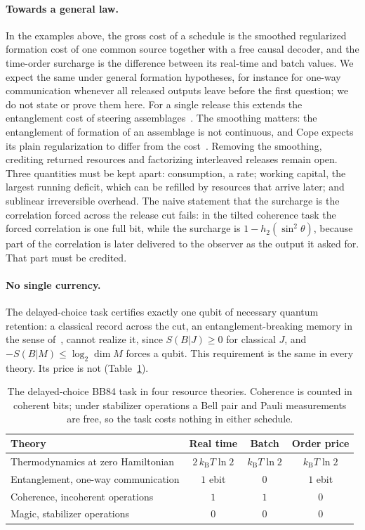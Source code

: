 \documentclass[11pt]{article}
\theoremstyle{definition}
\theoremstyle{remark}
\newcommand{\kB}{k_{\mathrm B}}
\begin{document}
\paragraph{Towards a general law.} In the examples above, the gross cost of a schedule is the smoothed regularized formation cost of one common source together with a free causal decoder, and the time-order surcharge is the difference between its real-time and batch values. We expect the same under general formation hypotheses, for instance for one-way communication whenever all released outputs leave before the first question; we do not state or prove them here. For a single release this extends the entanglement cost of steering assemblages~\cite{Cope21}. The smoothing matters: the entanglement of formation of an assemblage is not continuous, and Cope expects its plain regularization to differ from the cost~\cite{Cope21}. Removing the smoothing, crediting returned resources and factorizing interleaved releases remain open. Three quantities must be kept apart: consumption, a rate; working capital, the largest running deficit, which can be refilled by resources that arrive later; and sublinear irreversible overhead. The naive statement that the surcharge is the correlation forced across the release cut fails: in the tilted coherence task the forced correlation is one full bit, while the surcharge is $1-h_2(\sin^2\theta)$, because part of the correlation is later delivered to the observer as the output it asked for. That part must be credited.

\paragraph{No single currency.} The delayed-choice task certifies exactly one qubit of necessary quantum retention: a classical record across the cut, an entanglement-breaking memory in the sense of~\cite{RBL18}, cannot realize it, since $S(B|J)\ge0$ for classical $J$, and $-S(B|M)\le\log_2\dim M$ forces a qubit. This requirement is the same in every theory. Its price is not (Table~\ref{tab:currency}).

\begin{table}[tbp]
\centering
\small
\begin{tabular}{lccc}
\toprule
Theory & Real time & Batch & Order price\\
\midrule
Thermodynamics at zero Hamiltonian & $2\,\kB T\ln2$ & $\kB T\ln2$ & $\kB T\ln2$\\
Entanglement, one-way communication & $1$ ebit & $0$ & $1$ ebit\\
Coherence, incoherent operations & $1$ & $1$ & $0$\\
Magic, stabilizer operations & $0$ & $0$ & $0$\\
\bottomrule
\end{tabular}
\caption{The delayed-choice BB84 task in four resource theories. Coherence is counted in coherent bits; under stabilizer operations a Bell pair and Pauli measurements are free, so the task costs nothing in either schedule.}\label{tab:currency}
\end{table}
\end{document}
